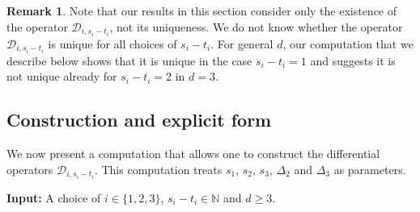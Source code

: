 \documentclass[12pt,a4paper]{extarticle}
\theoremstyle{definition}
\newtheorem{remark}[theorem]{Remark}
\begin{document}
\begin{remark}
    Note that our results in this section consider only the existence of the operator $\mathcal{D}_{i,s_i-t_i}$, not its uniqueness. We do not know whether the operator  $\mathcal{D}_{i,s_i-t_i}$ is unique for all choices of $s_i-t_i$. For general $d$, our computation that we describe below shows that it is unique in the case $s_i-t_i=1$ and suggests it is not unique already for $s_i-t_i=2$ in $d = 3$. 
\end{remark}


\subsection{Construction and explicit form}
We now present a computation that allows one to construct the differential operators $\mathcal{D}_{i,s_i-t_i}$.
This computation treats $s_1$, $s_2$, $s_3$, $\Delta_2$ and $\Delta_3$ as parameters. 
\newline



\noindent\textbf{Input:} A choice of $i\in\{1,2,3\}$, $s_i-t_i\in\mathbb{N}$ and $d\ge3$.
\end{document}
